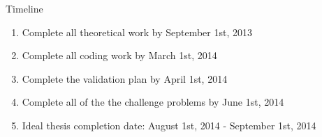 \documentclass{beamer}
\begin{document}
\begin{frame}{Timeline}

  \begin{enumerate}
    \item Complete all theoretical work by September 1st, 2013
      \bigskip
    \item Complete all coding work by March 1st, 2014
      \bigskip
    \item Complete the validation plan by April 1st, 2014
      \bigskip
    \item Complete all of the the challenge problems by June 1st, 2014
      \bigskip
    \item Ideal thesis completion date: August 1st, 2014 - September 1st, 2014
\end{enumerate}

\end{frame}
\end{document}
